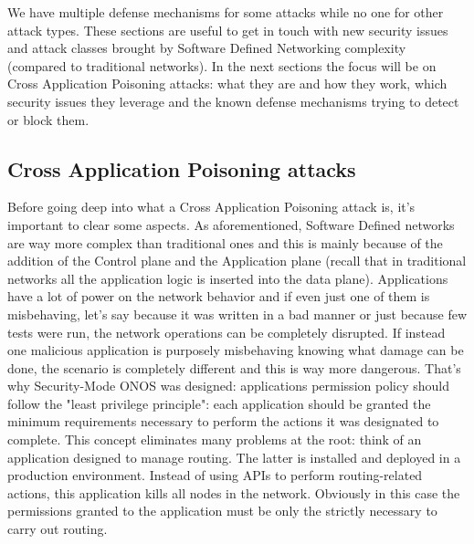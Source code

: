 We have multiple defense mechanisms for some attacks while no one for other attack types. These sections are useful to get in touch with new security issues and attack classes brought by Software Defined Networking complexity (compared to traditional networks). In the next sections the focus will be on Cross Application Poisoning attacks: what they are and how they work, which security issues they leverage and the known defense mechanisms trying to detect or block them.  

\subsection{Cross Application Poisoning attacks}
Before going deep into what a Cross Application Poisoning attack is, it's important to clear some aspects. As aforementioned, Software Defined networks are way more complex than traditional ones and this is mainly because of the addition of the Control plane and the Application plane (recall that in traditional networks all the application logic is inserted into the data plane). Applications have a lot of power on the network behavior and if even just one of them is misbehaving, let's say because it was written in a bad manner or just because few tests were run, the network operations can be completely disrupted. If instead one malicious application is purposely misbehaving knowing what damage can be done, the scenario is completely different and this is way more dangerous. That's why Security-Mode ONOS was designed: applications permission policy should follow the "least privilege principle": each application should be granted the minimum requirements necessary to perform the actions it was designated to complete. This concept eliminates many problems at the root: think of an application designed to manage routing. The latter is installed and deployed in a production environment. Instead of using APIs to perform routing-related actions, this application kills all nodes in the network. Obviously in this case the permissions granted to the application must be only the strictly necessary to carry out routing.

